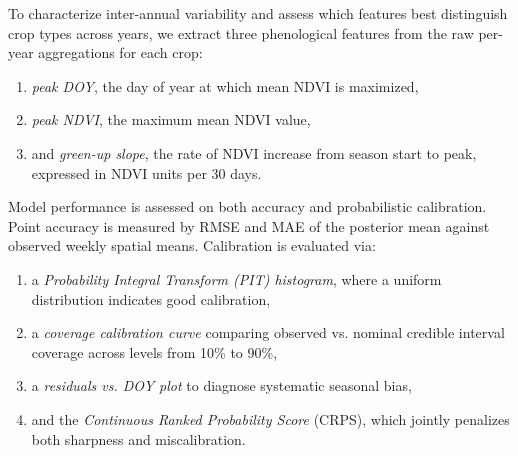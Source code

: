 \documentclass{article}
\begin{document}
To characterize inter-annual variability and assess which features best distinguish crop types across years, we extract three phenological features from the raw per-year aggregations for each crop: 
\begin{enumerate}
    \item \textit{peak DOY}, the day of year at which mean NDVI is maximized,
    \item \textit{peak NDVI}, the maximum mean NDVI value,
    \item and \textit{green-up slope}, the rate of NDVI increase from season start to peak, expressed in NDVI units per 30 days.
\end{enumerate}

Model performance is assessed on both accuracy and probabilistic calibration. Point accuracy is measured by RMSE and MAE of the posterior mean against observed weekly spatial means. Calibration is evaluated via: 
\begin{enumerate}
    \item a \textit{Probability Integral Transform (PIT) histogram}, where a uniform distribution indicates good calibration,
    \item a \textit{coverage calibration curve} comparing observed vs. nominal credible interval coverage across levels from 10\% to 90\%,
    \item a \textit{residuals vs. DOY plot} to diagnose systematic seasonal bias,
    \item and the \textit{Continuous Ranked Probability Score} (CRPS), which jointly penalizes both sharpness and miscalibration.
\end{enumerate}

\end{document}
